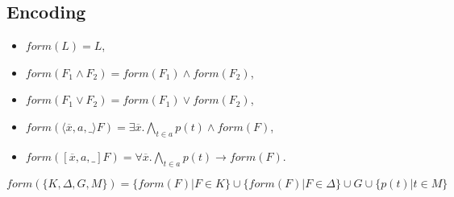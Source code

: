 \documentclass[a4paper,11pt]{article}
\newcommand{\F}{\mathit{form}}
\begin{document}
\subsection{Encoding}
\begin{itemize}
 \item $\F(L)=L$,
 \item $\F(F_1\wedge F_2)=\F(F_1)\wedge\F(F_2)$,
 \item $\F(F_1\vee F_2)=\F(F_1)\vee\F(F_2)$,
 \item $\F(\langle\overline x,a,\_\rangle F)=\exists\overline x.\bigwedge_{t\in a} p(t)\wedge\F(F)$,
 \item $\F([\overline x,a,\_]F)=\forall \overline x.\bigwedge_{t\in a} p(t)\rightarrow\F(F)$.
\end{itemize}
$\F(\{K,\Delta,G,M\})=\{\F(F)|F\in K\}\cup\{\F(F)|F\in\Delta\}\cup G\cup\{p(t)|t\in M\}$
\end{document}
